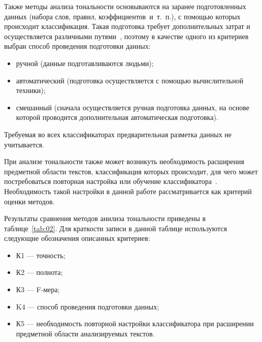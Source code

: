 Также методы анализа тональности основываются на заранее подготовленных данных
(набора слов, правил, коэффициентов~и~т.~п.), с помощью которых происходит
классификация. Такая подготовка требует дополнительных затрат и осуществляется
различными путями~\cite{article21}, поэтому в качестве одного из критериев
выбран способ проведения подготовки данных:
\begin{itemize}
    \item ручной (данные подготавливаются людьми);
    \item автоматический (подготовка осуществляется с помощью вычислительной
        техники);
    \item смешанный (сначала осуществляется ручная подготовка данных, на основе
        которой проводится дополнительная автоматическая подготовка).
\end{itemize}

Требуемая во всех классификаторах предварительная разметка данных не
учитывается.

При анализе тональности также может возникуть необходимость расширения
предметной области текстов, классификация которых происходит, для чего может
постребоваться повторная настройка или обучение
классификатора~\cite{article21}.  Необходимость такой настройки в данной
работе рассматривается как критерий оценки методов.

Результаты сравнения методов анилиза тональности приведены в
таблице~\ref{tab:02}. Для краткости записи в данной таблице используются
следующие обозначения описанных критериев:
\begin{itemize}
    \item К1 --- точность;
    \item К2 --- полнота;
    \item К3 --- F-мера;
    \item K4 --- способ проведения подготовки данных;
    \item К5 --- необходимость повторной настройки классификатора при расширении
        предметной области анализируемых текстов.
\end{itemize}

